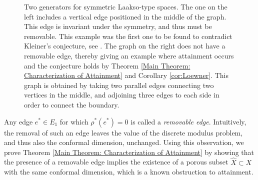 \documentclass{amsart}
\numberwithin{equation}{section}
\theoremstyle{definition}
\theoremstyle{remark}
\begin{document}
    \begin{figure}[!ht]
    \caption{Two generators for symmetric Laakso-type spaces. The one on the left includes a vertical edge positioned in the middle of the graph. This edge is invariant under the symmetry, and thus must be removable. This example was the first one to be found to contradict Kleiner's conjecture, see \cite{anttila2024constructions}. The graph on the right does not have a removable edge, thereby giving an example where attainment occurs and the conjecture holds by Theorem \ref{Main Theorem: Characterization of Attainment} and Corollary \ref{cor:Loewner}. This graph is obtained by taking two parallel edges connecting two vertices in the middle, and adjoining three edges to each side in order to connect the boundary.}
    \label{fig:placeholder}
    \end{figure}


Any edge \(e^*\in E_1\) for which \(\rho^*(e^*)=0\) is called a \emph{removable edge}. Intuitively, the removal of such an edge leaves the value of the discrete modulus problem, and thus also the conformal dimension, unchanged. Using this observation, we prove Theorem \ref{Main Theorem: Characterization of Attainment} by showing that the presence of a removable edge implies the existence of a porous subset \(\widehat{X}\subset X\) with the same conformal dimension, which is a known obstruction to attainment. 
\end{document}
